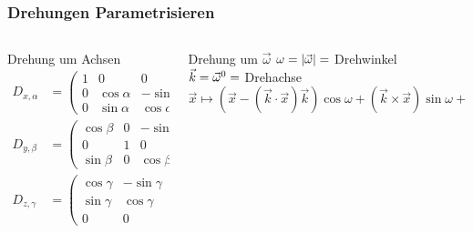%
%
%
\bgroup
{}
\begin{frame}[t]
\setlength{\abovedisplayskip}{5pt}
\setlength{\belowdisplayskip}{5pt}
\frametitle{Drehungen Parametrisieren}
\vspace{-20pt}
\begin{columns}[t,onlytextwidth]
\begin{column}{0.4\textwidth}
\begin{block}{Drehung um Achsen}
\begin{align*}
D_{x,\alpha}
&=
\begin{pmatrix}
1&0&0\\0&\cos\alpha&-\sin\alpha\\0&\sin\alpha&\cos\alpha
\end{pmatrix}
\\
D_{y,\beta}
&=
\begin{pmatrix}
\cos\beta&0&-\sin\beta\\0&1&0\\\sin\beta&0&\cos\beta
\end{pmatrix}
\\
D_{z,\gamma}
&=
\begin{pmatrix}
\cos\gamma&-\sin\gamma&0\\\sin\gamma&\cos\gamma&0\\0&0&1
\end{pmatrix}
\end{align*}
\end{block}
\end{column}
\begin{column}{0.56\textwidth}
\begin{block}{Drehung um $\vec{\omega}$}
$\omega=|\vec{\omega}|=\mathstrut$Drehwinkel
\\
$\vec{k}=\vec{\omega}^0=\mathstrut$Drehachse
\[
\vec{x}
\mapsto
(\vec{x} -(\vec{k}\cdot\vec{x})\vec{k})
\cos\omega
+
(\vec{k}\times\vec{x})\sin\omega
+
\vec{k}(\vec{k}\cdot\vec{x}) 
\]
\vspace{-40pt}
\begin{center}
\end{center}
\end{block}
\end{column}
\end{columns}
\end{frame}
